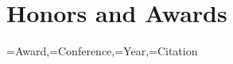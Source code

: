 

\section{Honors and Awards}
\noindent
{}
{\award=Award,\conference=Conference,\year=Year,\citation=Citation}
{\award\DTLifnullorempty{\conference}{}{, \conference}\DTLifnullorempty{\citation}{}{~\cite{\citation}} \hfill \year\\
}
